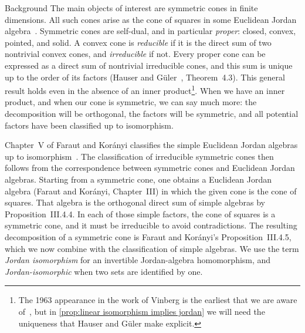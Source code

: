 \documentclass{interact}
\theoremstyle{plain}
\theoremstyle{definition}
\theoremstyle{remark}
\begin{document}
  \begin{section}{Background}
    The main objects of interest are symmetric cones in finite
    dimensions. All such cones arise as the cone of squares in some
    Euclidean Jordan algebra~\cite{faraut-koranyi}. Symmetric cones
    are self-dual, and in particular \emph{proper}: closed, convex,
    pointed, and solid. A convex cone is \emph{reducible} if it is the
    direct sum of two nontrivial convex cones, and \emph{irreducible}
    if not. Every proper cone can be expressed as a direct sum of
    nontrivial irreducible cones, and this sum is unique up to the
    order of its factors (Hauser and Güler~\cite{hauser-guler},
    Theorem~4.3). This general result holds even in the absence of an
    inner product\footnote{The 1963 appearance in the work of Vinberg
    is the earliest that we are aware of~\cite{vinberg_-_theory}, but
    in \cref{prop:linear isomorphism implies jordan} we will need the
    uniqueness that Hauser and Güler make explicit.}. When we have an
    inner product, and when our cone is symmetric, we can say much
    more: the decomposition will be orthogonal, the factors will be
    symmetric, and all potential factors have been classified up to
    isomorphism.

    Chapter~V of Faraut and Korányi classifies the simple Euclidean
    Jordan algebras up to isomorphism~\cite{faraut-koranyi}. The
    classification of irreducible symmetric cones then follows from
    the correspondence between symmetric cones and Euclidean Jordan
    algebras. Starting from a symmetric cone, one obtains a Euclidean
    Jordan algebra (Faraut and Korányi, Chapter~III) in which the
    given cone is the cone of squares. That algebra is the orthogonal
    direct sum of simple algebras by Proposition~III.4.4. In each of
    those simple factors, the cone of squares is a symmetric cone, and
    it must be irreducible to avoid contradictions. The resulting
    decomposition of a symmetric cone is Faraut and Korányi's
    Proposition~III.4.5, which we now combine with the classification
    of simple algebras. We use the term \emph{Jordan isomorphism} for
    an invertible Jordan-algebra homomorphism, and
    \emph{Jordan-isomorphic} when two sets are identified by one.


\end{section}
\end{document}

